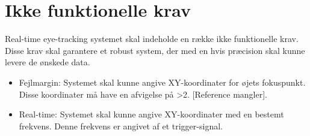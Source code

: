 \documentclass[kravspec.tex]{subfiles}
\begin{document}
	
\section{Ikke funktionelle krav}
Real-time eye-tracking systemet skal indeholde en række ikke funktionelle krav. Disse krav skal garantere et robust system, der med en hvis præcision skal kunne levere de ønskede data.\\
\begin{itemize}
	\item 
	Fejlmargin: Systemet skal kunne angive XY-koordinater for øjets fokuspunkt. Disse koordinater må have en afvigelse på >2\degree. [Reference mangler].
	\item 
	Real-time: Systemet skal kunne angive XY-koordinater med en bestemt frekvens. Denne frekvens er angivet af et trigger-signal. 
\end{itemize}
\end{document}
